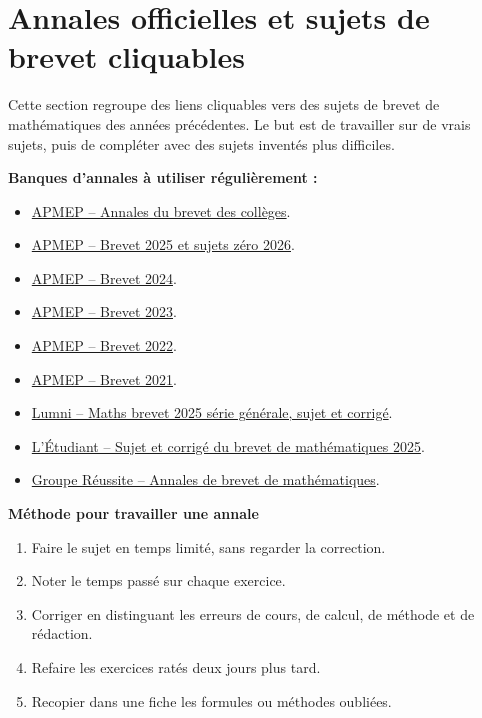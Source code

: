 \section{Annales officielles et sujets de brevet cliquables}

\begin{objectif}
Cette section regroupe des liens cliquables vers des sujets de brevet de mathématiques des années précédentes. 
Le but est de travailler sur de vrais sujets, puis de compléter avec des sujets inventés plus difficiles.
\end{objectif}

\begin{retenir}
\textbf{Banques d'annales à utiliser régulièrement :}
\begin{itemize}
  \item \href{https://www.apmep.fr/Annales-du-Brevet-des-colleges}{APMEP -- Annales du brevet des collèges}.
  \item \href{https://www.apmep.fr/Brevet-2025}{APMEP -- Brevet 2025 et sujets zéro 2026}.
  \item \href{https://www.apmep.fr/Brevet-2024}{APMEP -- Brevet 2024}.
  \item \href{https://www.apmep.fr/Brevet-2023}{APMEP -- Brevet 2023}.
  \item \href{https://www.apmep.fr/Brevet-2022}{APMEP -- Brevet 2022}.
  \item \href{https://www.apmep.fr/Brevet-2021}{APMEP -- Brevet 2021}.
  \item \href{https://www.lumni.fr/article/maths-sujets-et-corriges-serie-generale-brevet-2025}{Lumni -- Maths brevet 2025 série générale, sujet et corrigé}.
  \item \href{https://www.letudiant.fr/college/brevet/sujets-et-corriges-du-brevet-de-mathematiques-2025-dnb.html}{L'Étudiant -- Sujet et corrigé du brevet de mathématiques 2025}.
  \item \href{https://groupe-reussite.fr/ressources/annales-brevet-maths/}{Groupe Réussite -- Annales de brevet de mathématiques}.
\end{itemize}
\end{retenir}

\begin{methode}
\textbf{Méthode pour travailler une annale}
\begin{enumerate}
  \item Faire le sujet en temps limité, sans regarder la correction.
  \item Noter le temps passé sur chaque exercice.
  \item Corriger en distinguant les erreurs de cours, de calcul, de méthode et de rédaction.
  \item Refaire les exercices ratés deux jours plus tard.
  \item Recopier dans une fiche les formules ou méthodes oubliées.
\end{enumerate}
\end{methode}

